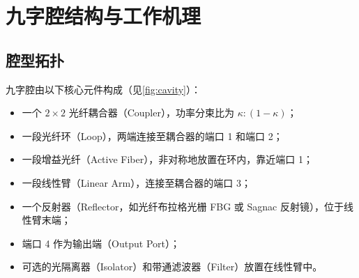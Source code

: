 \documentclass[11pt,a4paper]{ctexart}
\begin{document}
\section{九字腔结构与工作机理}
\label{sec:structure}

\subsection{腔型拓扑}

九字腔由以下核心元件构成（见\cref{fig:cavity}）：

\begin{itemize}
  \item 一个 $2\times2$ 光纤耦合器（Coupler），功率分束比为 $\kappa : (1-\kappa)$；
  \item 一段光纤环（Loop），两端连接至耦合器的端口 1 和端口 2；
  \item 一段增益光纤（Active Fiber），非对称地放置在环内，靠近端口 1；
  \item 一段线性臂（Linear Arm），连接至耦合器的端口 3；
  \item 一个反射器（Reflector，如光纤布拉格光栅 FBG 或 Sagnac 反射镜），位于线性臂末端；
  \item 端口 4 作为输出端（Output Port）；
  \item 可选的光隔离器（Isolator）和带通滤波器（Filter）放置在线性臂中。
\end{itemize}
\end{document}
